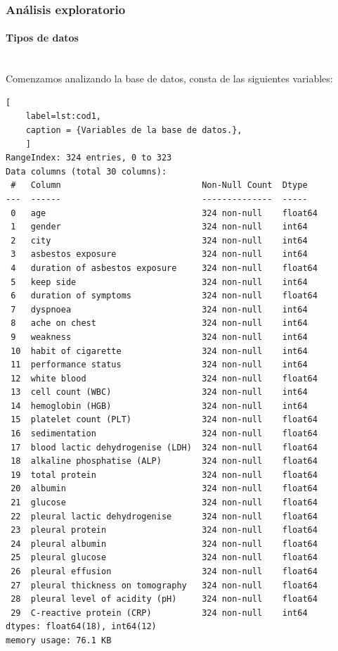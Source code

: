 \documentclass{article}
\newcommand{\subsubsubsection}[1]{\paragraph{#1}\mbox{}\\}
\begin{document}
\clearpage
\subsubsection{Análisis exploratorio}
\subsubsubsection{Tipos de datos}

Comenzamos analizando la base de datos,  consta de las siguientes
variables:
\begin{lstlisting}[
	label=lst:cod1,
	caption = {Variables de la base de datos.},
	]
RangeIndex: 324 entries, 0 to 323
Data columns (total 30 columns):
 #   Column                            Non-Null Count  Dtype
---  ------                            --------------  -----
 0   age                               324 non-null    float64
 1   gender                            324 non-null    int64
 2   city                              324 non-null    int64
 3   asbestos exposure                 324 non-null    int64
 4   duration of asbestos exposure     324 non-null    float64
 5   keep side                         324 non-null    int64
 6   duration of symptoms              324 non-null    float64
 7   dyspnoea                          324 non-null    int64
 8   ache on chest                     324 non-null    int64
 9   weakness                          324 non-null    int64
 10  habit of cigarette                324 non-null    int64
 11  performance status                324 non-null    int64
 12  white blood                       324 non-null    float64
 13  cell count (WBC)                  324 non-null    int64
 14  hemoglobin (HGB)                  324 non-null    int64
 15  platelet count (PLT)              324 non-null    float64
 16  sedimentation                     324 non-null    float64
 17  blood lactic dehydrogenise (LDH)  324 non-null    float64
 18  alkaline phosphatise (ALP)        324 non-null    float64
 19  total protein                     324 non-null    float64
 20  albumin                           324 non-null    float64
 21  glucose                           324 non-null    float64
 22  pleural lactic dehydrogenise      324 non-null    float64
 23  pleural protein                   324 non-null    float64
 24  pleural albumin                   324 non-null    float64
 25  pleural glucose                   324 non-null    float64
 26  pleural effusion                  324 non-null    float64
 27  pleural thickness on tomography   324 non-null    float64
 28  pleural level of acidity (pH)     324 non-null    float64
 29  C-reactive protein (CRP)          324 non-null    int64
dtypes: float64(18), int64(12)
memory usage: 76.1 KB
\end{lstlisting}
\end{document}
